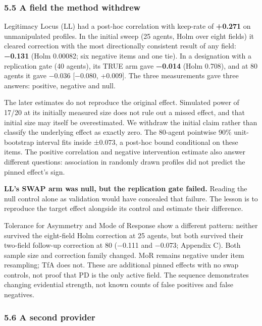 \documentclass[
  11pt]{article}
\begin{document}
\subsubsection{5.5 A field the method
withdrew}\label{a-field-the-method-withdrew}

Legitimacy Locus (LL) had a post-hoc correlation with keep-rate of
\textbf{+0.271} on unmanipulated profiles. In the initial sweep (25
agents, Holm over eight fields) it cleared correction with the most
directionally consistent result of any field: \textbf{−0.131} (Holm
0.00082; six negative items and one tie). In a designation with a
replication gate (40 agents), its TRUE arm gave \textbf{−0.014} (Holm
0.708), and at 80 agents it gave −0.036 {[}−0.080, +0.009{]}. The three
measurements gave three answers: positive, negative and null.

The later estimates do not reproduce the original effect. Simulated
power of 17/20 at its initially measured size does not rule out a missed
effect, and that initial size may itself be overestimated. We withdraw
the initial claim rather than classify the underlying effect as exactly
zero. The 80-agent pointwise 90\% unit-bootstrap interval fits inside
±0.073, a post-hoc bound conditional on these items. The positive
correlation and negative intervention estimate also answer different
questions: association in randomly drawn profiles did not predict the
pinned effect's sign.

\textbf{LL's SWAP arm was null, but the replication gate failed.}
Reading the null control alone as validation would have concealed that
failure. The lesson is to reproduce the target effect alongside its
control and estimate their difference.

Tolerance for Asymmetry and Mode of Response show a different pattern:
neither survived the eight-field Holm correction at 25 agents, but both
survived their two-field follow-up correction at 80 (−0.111 and −0.073;
Appendix C). Both sample size and correction family changed. MoR remains
negative under item resampling; TfA does not. These are additional
pinned effects with no swap controls, not proof that PD is the only
active field. The sequence demonstrates changing evidential strength,
not known counts of false positives and false negatives.

\subsubsection{5.6 A second provider}\label{a-second-provider}
\end{document}
